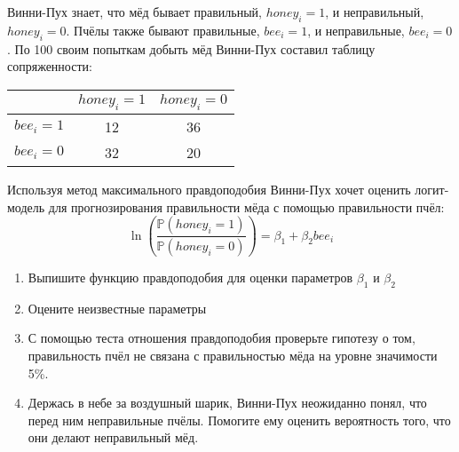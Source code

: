 \documentclass[pdftex,11pt,openany]{book}\usepackage[]{graphicx}\usepackage[]{color}
\begin{document}
\begin{problem}
Винни-Пух знает, что мёд бывает правильный, $honey_i=1$, и неправильный, $honey_i=0$. Пчёлы также бывают правильные, $bee_i=1$, и неправильные, $bee_i=0$. По 100 своим попыткам добыть мёд Винни-Пух составил таблицу сопряженности:

\begin{tabular}{c|cc}
 & $honey_i=1$ & $honey_i=0$ \\ 
\hline 
$bee_i=1$ & 12 & 36 \\ 
$bee_i=0$ & 32 & 20 \\ 
\end{tabular} 

Используя метод максимального правдоподобия Винни-Пух хочет оценить логит-модель для прогнозирования правильности мёда с помощью правильности пчёл:
\[
\ln \left(\frac{\mathbb{P}(honey_i=1)}{\mathbb{P}(honey_i=0)} \right)=\beta_1 + \beta_2 bee_i 
\]
\begin{enumerate}
\item Выпишите функцию правдоподобия для оценки параметров $\beta_1$ и $\beta_2$
\item Оцените неизвестные параметры
\item С помощью теста отношения правдоподобия проверьте гипотезу о том, правильность пчёл не связана с правильностью мёда на уровне значимости 5\%.
\item Держась в небе за воздушный шарик, Винни-Пух неожиданно понял, что перед ним неправильные пчёлы. Помогите ему оценить вероятность того, что они делают неправильный мёд.
\end{enumerate}
\end{problem}
\end{document}
